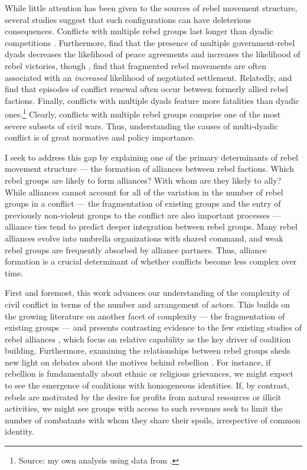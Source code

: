 \documentclass[12pt,]{book}
\let\rmarkdownfootnote\footnote%
\def\footnote{\protect\rmarkdownfootnote}
\begin{document}
While little attention has been given to the sources of rebel movement
structure, several studies suggest that such configurations can have
deleterious consequences. Conflicts with multiple rebel groups last
longer than dyadic competitions
\citep{Cunningham2006, Cunningham2009, Akcinaroglu2012}. Furthermore,
\citet{Cunningham2009} find that the presence of multiple
government-rebel dyads decreases the likelihood of peace agreements and
increases the likelihood of rebel victories, though \citet{Findley2012},
find that fragmented rebel movements are often associated with an
\emph{increased} likelihood of negotiated settlement. Relatedly,
\citet{Atlas1999} and \citet{Zeigler2016} find that episodes of conflict
renewal often occur between formerly allied rebel factions. Finally,
conflicts with multiple dyads feature more fatalities than dyadic
ones.\footnote{Source: my own analysis using data from
  \citet{Sundberg2008a}.} Clearly, conflicts with multiple rebel groups
comprise one of the most severe subsets of civil wars. Thus,
understanding the causes of multi-dyadic conflict is of great normative
and policy importance.

I seek to address this gap by explaining one of the primary determinants
of rebel movement structure --- the formation of alliances between rebel
factions. Which rebel groups are likely to form alliances? With whom are
they likely to ally? While alliances cannot account for all of the
variation in the number of rebel groups in a conflict --- the
fragmentation of existing groups and the entry of previously non-violent
groups to the conflict are also important processes --- alliance ties
tend to predict deeper integration between rebel groups. Many rebel
alliances evolve into umbrella organizations with shared command, and
weak rebel groups are frequently absorbed by alliance partners. Thus,
alliance formation is a crucial determinant of whether conflicts become
less complex over time.

First and foremost, this work advances our understanding of the
complexity of civil conflict in terms of the number and arrangement of
actors. This builds on the growing literature on another facet of
complexity --- the fragmentation of existing groups
\citep[see][]{Cunningham2009, Pearlman2011a, Staniland2014} --- and
presents contrasting evidence to the few existing studies of rebel
alliances \citep{Christia2012, Bapat2012}, which focus on relative
capability as the key driver of coalition building. Furthermore,
examining the relationships between rebel groups sheds new light on
debates about the motives behind rebellion \citep[e.g.][]{Collier2004}.
For instance, if rebellion is fundamentally about ethnic or religious
grievances, we might expect to see the emergence of coalitions with
homogeneous identities. If, by contrast, rebels are motivated by the
desire for profits from natural resources or illicit activities, we
might see groups with access to such revenues seek to limit the number
of combatants with whom they share their spoils, irrespective of common
identity.
\end{document}

